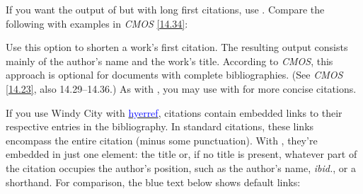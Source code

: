 \documentclass[11pt,letterpaper,oneside]{article}
\begin{document}
\begin{optionlist}

\noindent If you want the output of  but with long first
citations, use . Compare the following with examples
in \textit{CMOS} \ref{14.34}:


\begin{citeonly}
\item \cite[3]{morrison2004a}
\item \cite[18]{morrison2004a}
\item \cite[18]{morrison2004a}
\item \cite[24--26]{morrison2004a}
\item \cite[401-2]{morrison2004b}
\item \cite[433]{morrison2004b}
\item \cite[37--38]{diaz2007}
\item \cite[403]{morrison2004b}
\item \cite[152]{diaz2007}
\item \cite[201-2]{diaz2007}
\item \cites[240]{morrison2004b}[32]{morrison2004a}
\item \cite[33]{morrison2004a}
\end{citeonly}


\noindent Use this option to shorten a work's first citation. The
resulting output consists mainly of the author's name and the work's
title. According to \textit{CMOS}, this approach is optional for
documents with complete bibliographies. (See \textit{CMOS}
\ref{14.23}, also 14.29--14.36.) As with , you may use
 with  for more concise citations.


\noindent If you use Windy City with
\href{http://www.ctan.org/pkg/hyperref}{\textcolor{blue}{hyerref}},
citations contain embedded links to their respective entries in the
bibliography. In standard citations, these links encompass the entire
citation (minus some punctuation). With , they're
embedded in just one element: the title or, if no title is present,
whatever part of the citation occupies the author's position, such as
the author's name, \textit{ibid.}, or a shorthand. For comparison, the
blue text below shows default links:


\end{optionlist}
\end{document}

